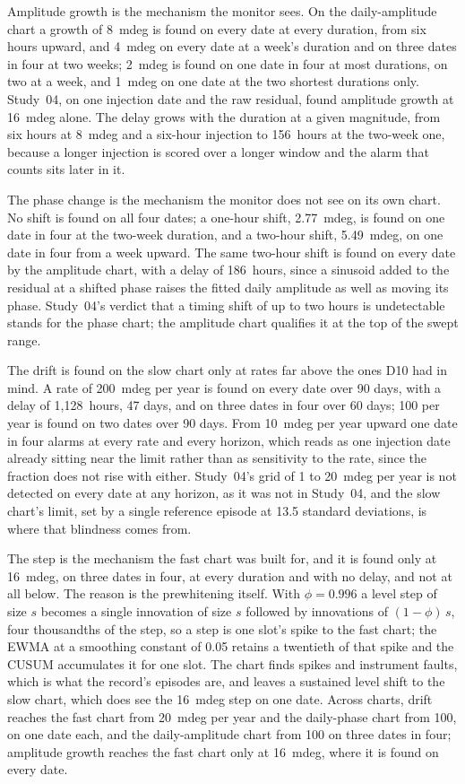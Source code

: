 \documentclass[11pt,a4paper]{article}
\begin{document}
Amplitude growth is the mechanism the monitor sees. On the daily-amplitude
chart a growth of 8~mdeg is found on every date at every duration, from six
hours upward, and 4~mdeg on every date at a week's duration and on three dates
in four at two weeks; 2~mdeg is found on one date in four at most durations,
on two at a week, and 1~mdeg on one date at the two shortest durations only.
Study~04, on one injection date and the raw residual, found amplitude growth
at 16~mdeg alone. The delay grows with the duration at a given magnitude, from
six hours at 8~mdeg and a six-hour injection to 156~hours at the two-week one,
because a longer injection is scored over a longer window and the alarm that
counts sits later in it.

The phase change is the mechanism the monitor does not see on its own chart.
No shift is found on all four dates; a one-hour shift, 2.77~mdeg, is found on
one date in four at the two-week duration, and a two-hour shift, 5.49~mdeg, on
one date in four from a week upward. The same two-hour shift is found on every
date by the amplitude chart, with a delay of 186~hours, since a sinusoid added
to the residual at a shifted phase raises the fitted daily amplitude as well
as moving its phase. Study~04's verdict that a timing shift of up to two
hours is undetectable stands for the phase chart; the amplitude chart
qualifies it at the top of the swept range.

The drift is found on the slow chart only at rates far above the ones D10 had
in mind. A rate of 200~mdeg per year is found on every date over 90 days, with
a delay of 1,128~hours, 47 days, and on three dates in four over 60 days; 100
per year is found on two dates over 90 days. From 10~mdeg per year upward one
date in four alarms at every rate and every horizon, which reads as one
injection date already sitting near the limit rather than as sensitivity to the
rate, since the fraction does not rise with either. Study~04's grid of 1 to
20~mdeg per year is not detected on every date at any horizon, as it was not
in Study~04, and the slow chart's limit, set by a single reference episode at
13.5 standard deviations, is where that blindness comes from.

The step is the mechanism the fast chart was built for, and it is found only
at 16~mdeg, on three dates in four, at every duration and with no delay, and
not at all below. The reason is the prewhitening itself. With $\phi = 0.996$ a
level step of size $s$ becomes a single innovation of size $s$ followed by
innovations of $(1 - \phi)\,s$, four thousandths of the step, so a step is one
slot's spike to the fast chart; the EWMA at a smoothing constant of 0.05
retains a twentieth of that spike and the CUSUM accumulates it for one slot.
The chart finds spikes and instrument faults, which is what the record's
episodes are, and leaves a sustained level shift to the slow chart, which
does see the 16~mdeg step on one date. Across charts, drift reaches the fast
chart from 20~mdeg per year and the daily-phase chart from 100, on one date
each, and the daily-amplitude chart from 100 on three dates in four; amplitude
growth reaches the fast chart only at 16~mdeg, where it is found on every date.
\end{document}
